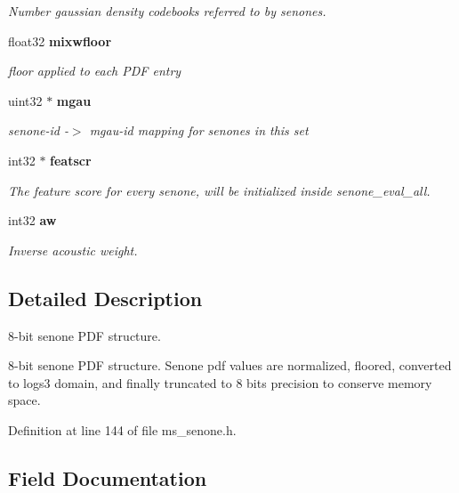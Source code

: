 \begin{DoxyCompactItemize}
\begin{DoxyCompactList}\small\item\em Number gaussian density codebooks referred to by senones. \end{DoxyCompactList}\item 
float32 {\bf mixwfloor}\label{structsenone__t_af3f77493f07dd1740084ea8dc4541cb1}

\begin{DoxyCompactList}\small\item\em floor applied to each P\+D\+F entry \end{DoxyCompactList}\item 
uint32 $\ast$ {\bf mgau}\label{structsenone__t_a5f0eee5a11e7c10b20e0cce10305edfc}

\begin{DoxyCompactList}\small\item\em senone-\/id -\/$>$ mgau-\/id mapping for senones in this set \end{DoxyCompactList}\item 
int32 $\ast$ {\bf featscr}\label{structsenone__t_a58af20c262d9d633f53c8c1c7e60459e}

\begin{DoxyCompactList}\small\item\em The feature score for every senone, will be initialized inside senone\+\_\+eval\+\_\+all. \end{DoxyCompactList}\item 
int32 {\bf aw}\label{structsenone__t_ad9b17f6aecf056fcea0eaaab0c7d35ca}

\begin{DoxyCompactList}\small\item\em Inverse acoustic weight. \end{DoxyCompactList}\end{DoxyCompactItemize}


\subsection{Detailed Description}
8-\/bit senone P\+D\+F structure. 

8-\/bit senone P\+D\+F structure. Senone pdf values are normalized, floored, converted to logs3 domain, and finally truncated to 8 bits precision to conserve memory space. 

Definition at line 144 of file ms\+\_\+senone.\+h.



\subsection{Field Documentation}
